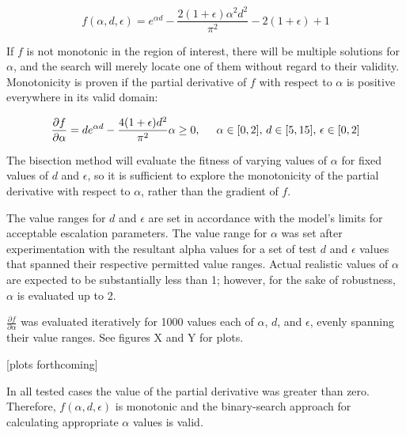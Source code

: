\documentclass{article}
\begin{document}
\begin{equation}
  f(\alpha, d, \epsilon) = e^{\alpha d} - \frac{2 (1 + \epsilon) \alpha^2 d^2}{\pi^2} - 2 (1 + \epsilon) + 1
\end{equation}

If $f$ is not monotonic in the region of interest, there will be multiple solutions for $\alpha$, and the search will merely locate one of them without regard to their validity.
Monotonicity is proven if the partial derivative of $f$ with respect to $\alpha$ is positive everywhere in its valid domain:

\begin{equation}
  \frac{\partial f}{\partial \alpha} = d e^{\alpha d} - \frac{4 (1 + \epsilon) d^2}{\pi^2} \alpha \ge 0, \hspace{0.5 cm} \alpha \in [0, 2], \, d \in [5, 15], \, \epsilon \in [0, 2]
\end{equation}

The bisection method will evaluate the fitness of varying values of $\alpha$ for fixed values of $d$ and $\epsilon$, so it is sufficient to explore the monotonicity of the partial derivative with respect to $\alpha$, rather than the gradient of $f$.

The value ranges for $d$ and $\epsilon$ are set in accordance with the model's limits for acceptable escalation parameters.
The value range for $\alpha$ was set after experimentation with the resultant alpha values for a set of test $d$ and $\epsilon$ values that spanned their respective permitted value ranges.
Actual realistic values of $\alpha$ are expected to be substantially less than 1; however, for the sake of robustness, $\alpha$ is evaluated up to 2.

$\frac{\partial f}{\partial \alpha}$ was evaluated iteratively for 1000 values each of $\alpha$, $d$, and $\epsilon$, evenly spanning their value ranges. See figures X and Y for plots. \\

\begin{center}
  [plots forthcoming]
\end{center}

In all tested cases the value of the partial derivative was greater than zero. Therefore, $f(\alpha, d, \epsilon)$ is monotonic and the binary-search approach for calculating appropriate $\alpha$ values is valid.


%
\end{document}
